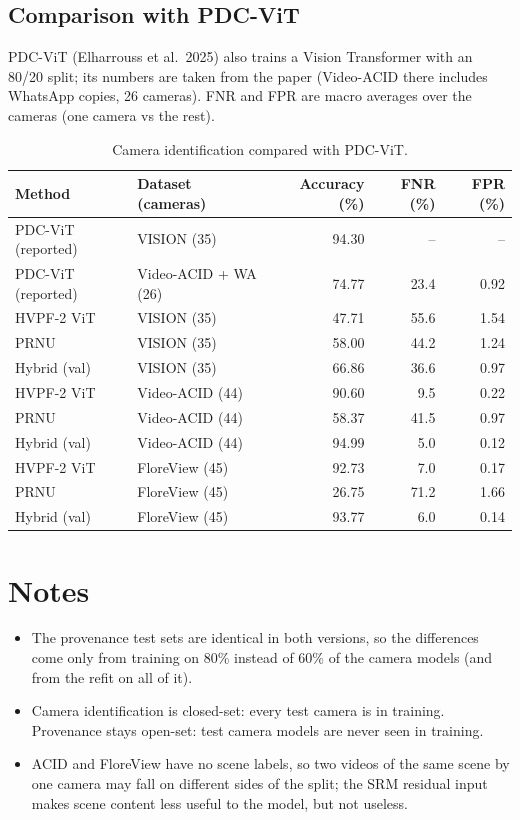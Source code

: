 \documentclass[11pt,a4paper]{article}
\begin{document}
\subsection{Comparison with PDC-ViT}
PDC-ViT (Elharrouss et al.\ 2025) also trains a Vision Transformer with an 80/20 split; its numbers are taken from the paper (Video-ACID there includes WhatsApp copies, 26 cameras). FNR and FPR are macro averages over the cameras (one camera vs the rest).
\begin{table}[H]\centering\small\caption{Camera identification compared with PDC-ViT.}\begin{tabular}{llrrr}\toprule Method & Dataset (cameras) & Accuracy (\%) & FNR (\%) & FPR (\%) \\\midrule
PDC-ViT (reported) & VISION (35) & 94.30 & -- & -- \\
PDC-ViT (reported) & Video-ACID + WA (26) & 74.77 & 23.4 & 0.92 \\\midrule
HVPF-2 ViT & VISION (35) & 47.71 & 55.6 & 1.54 \\
PRNU & VISION (35) & 58.00 & 44.2 & 1.24 \\
Hybrid (val) & VISION (35) & 66.86 & 36.6 & 0.97 \\
\midrule
HVPF-2 ViT & Video-ACID (44) & 90.60 & 9.5 & 0.22 \\
PRNU & Video-ACID (44) & 58.37 & 41.5 & 0.97 \\
Hybrid (val) & Video-ACID (44) & 94.99 & 5.0 & 0.12 \\
\midrule
HVPF-2 ViT & FloreView (45) & 92.73 & 7.0 & 0.17 \\
PRNU & FloreView (45) & 26.75 & 71.2 & 1.66 \\
Hybrid (val) & FloreView (45) & 93.77 & 6.0 & 0.14 \\
\bottomrule\end{tabular}\end{table}
\section{Notes}\begin{itemize}
\item The provenance test sets are identical in both versions, so the differences come only from training on 80\%
      instead of 60\% of the camera models (and from the refit on all of it).
\item Camera identification is closed-set: every test camera is in training. Provenance stays open-set: test camera
      models are never seen in training.
\item ACID and FloreView have no scene labels, so two videos of the same scene by one camera may fall on different
      sides of the split; the SRM residual input makes scene content less useful to the model, but not useless.
\end{itemize}
\end{document}
